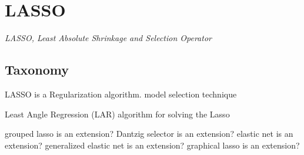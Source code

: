 
\section{LASSO} 
\label{sec:lasso}

\emph{LASSO, Least Absolute Shrinkage and Selection Operator}

\subsection{Taxonomy}
LASSO is a Regularization algorithm.
model selection technique

Least Angle Regression (LAR) algorithm for solving the Lasso

grouped lasso is an extension?
Dantzig selector is an extension?
elastic net is an extension?
generalized elastic net is an extension?
graphical lasso is an extension?




